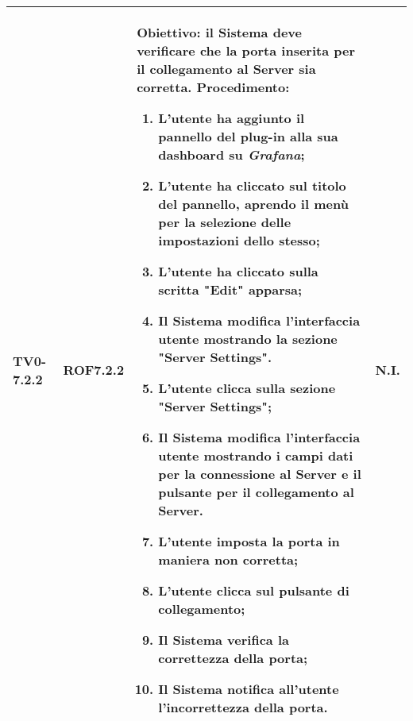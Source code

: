 \begin{longtable}{|C{.15\textwidth}|C{.13\textwidth}|m{.65\textwidth}|C{.08\textwidth}|}
TV0-7.2.2 & ROF7.2.2 &
	\textbf{Obiettivo}: il Sistema deve verificare che la porta inserita per il collegamento al Server sia corretta. \newline
	\textbf{Procedimento}:
	\begin{enumerate}
		\item L'utente ha aggiunto il pannello del plug-in alla sua dashboard su \textit{Grafana};
		\item L'utente ha cliccato sul titolo del pannello, aprendo il menù per la selezione delle impostazioni dello stesso;
		\item L'utente ha cliccato sulla scritta "Edit" apparsa;
		\item Il Sistema modifica l'interfaccia utente mostrando la sezione "Server Settings".
		\item L'utente clicca sulla sezione "Server Settings";
		\item Il Sistema modifica l'interfaccia utente mostrando i campi dati per la connessione al Server e il pulsante per il collegamento al Server.
		\item L'utente imposta la porta in maniera non corretta;
		\item L'utente clicca sul pulsante di collegamento;
		\item Il Sistema verifica la correttezza della porta;
		\item Il Sistema notifica all'utente l'incorrettezza della porta.
	\end{enumerate}
	& N.I. \\
\hline


\end{longtable}
